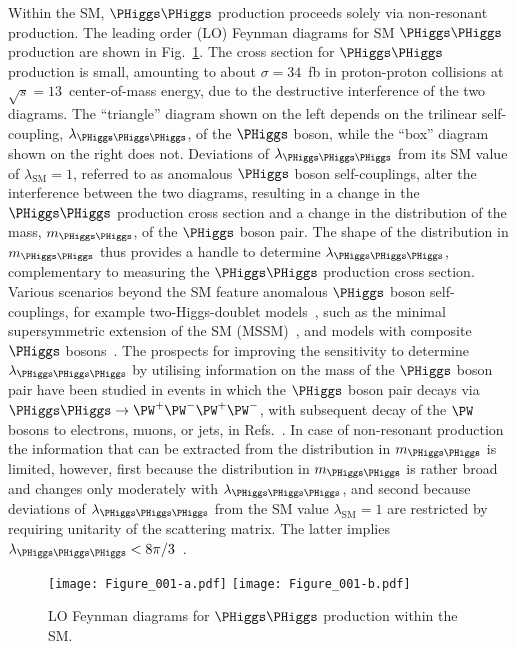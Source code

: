 Within the SM, $\PHiggs\PHiggs$ production proceeds solely via non-resonant production.
The leading order (LO) Feynman diagrams for SM $\PHiggs\PHiggs$ production are shown in Fig.~\ref{fig:FeynmanDiagrams_smHH}.
The cross section for $\PHiggs\PHiggs$ production is small, amounting to about $\sigma = 34$~fb in proton-proton collisions at $\sqrt{s}=13$~\TeV center-of-mass energy,
due to the destructive interference of the two diagrams.
The ``triangle'' diagram shown on the left depends on the trilinear self-coupling, $\lambda_{\PHiggs\PHiggs\PHiggs}$, of the $\PHiggs$ boson, 
while the ``box'' diagram shown on the right does not.
Deviations of $\lambda_{\PHiggs\PHiggs\PHiggs}$ from its SM value of $\lambda_{\textrm{SM}}=1$, referred to as anomalous $\PHiggs$ boson self-couplings,
alter the interference between the two diagrams, 
resulting in a change in the $\PHiggs\PHiggs$ production cross section and a change in the distribution of the mass, $m_{\PHiggs\PHiggs}$, of the $\PHiggs$ boson pair.
The shape of the distribution in $m_{\PHiggs\PHiggs}$ thus provides a handle to determine $\lambda_{\PHiggs\PHiggs\PHiggs}$,
complementary to measuring the $\PHiggs\PHiggs$ production cross section.
Various scenarios beyond the SM feature anomalous $\PHiggs$ boson self-couplings,
for example two-Higgs-doublet models~\cite{Branco:2011iw}, such as the minimal supersymmetric extension of the SM (MSSM)~\cite{Gunion:1989we},
and models with composite $\PHiggs$ bosons~\cite{Grober:2010yv,Contino:2012xk}.
The prospects for improving the sensitivity to determine $\lambda_{\PHiggs\PHiggs\PHiggs}$ by utilising information on the mass of the $\PHiggs$ boson pair
have been studied in events in which the $\PHiggs$ boson pair decays via $\PHiggs\PHiggs \to \PW^{+}\PW^{-}\PW^{+}\PW^{-}$, with subsequent decay of the $\PW$ bosons to electrons, muons, or jets,
in Refs.~\cite{Baur:2002rb,Baur:2002qd}.
In case of non-resonant production the information that can be extracted from the distribution in $m_{\PHiggs\PHiggs}$ is limited, however,
first because the distribution in $m_{\PHiggs\PHiggs}$ is rather broad and changes only moderately with $\lambda_{\PHiggs\PHiggs\PHiggs}$,
and second because deviations of $\lambda_{\PHiggs\PHiggs\PHiggs}$ from the SM value $\lambda_{\textrm{SM}}=1$ are restricted by requiring unitarity of the scattering matrix.
The latter implies $\lambda_{\PHiggs\PHiggs\PHiggs} < 8\pi/3$~\cite{Lee:1977yc}.

\begin{figure}
\centering
\texttt{[image: Figure\_001-a.pdf]} \hspace{\fill}
\texttt{[image: Figure\_001-b.pdf]} \hspace{\fill}
\caption{ LO Feynman diagrams for $\PHiggs\PHiggs$ production within the SM.}
\label{fig:FeynmanDiagrams_smHH}
\end{figure}

